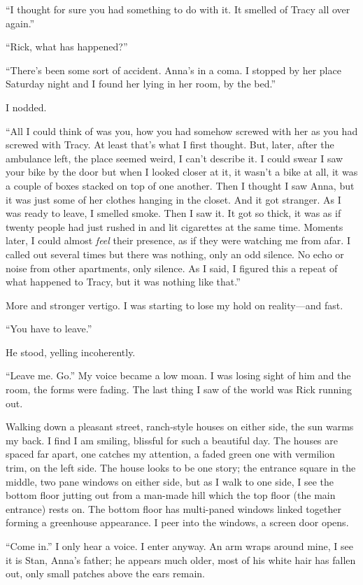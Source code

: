 ``I thought for sure you had something to do with it. It smelled of
Tracy all over again.''

``Rick, what has happened?''

``There's been some sort of accident. Anna's in a coma. I stopped by her
place Saturday night and I found her lying in her room, by the bed.''

I nodded.

``All I could think of was you, how you had somehow screwed with her as
you had screwed with Tracy. At least that's what I first thought. But,
later, after the ambulance left, the place seemed weird, I can't
describe it. I could swear I saw your bike by the door but when I looked
closer at it, it wasn't a bike at all, it was a couple of boxes stacked
on top of one another. Then I thought I saw Anna, but it was just some
of her clothes hanging in the closet. And it got stranger. As I was
ready to leave, I smelled smoke. Then I saw it. It got so thick, it was
as if twenty people had just rushed in and lit cigarettes at the same
time. Moments later, I could almost \emph{feel} their presence, as if
they were watching me from afar. I called out several times but there
was nothing, only an odd silence. No echo or noise from other
apartments, only silence. As I said, I figured this a repeat of what
happened to Tracy, but it was nothing like that.''

More and stronger vertigo. I was starting to lose my hold on
reality---and fast.

``You have to leave.''

He stood, yelling incoherently.

``Leave me. Go.'' My voice became a low moan. I was losing sight of him
and the room, the forms were fading. The last thing I saw of the world
was Rick running out.

Walking down a pleasant street, ranch-style houses on either side, the
sun warms my back. I find I am smiling, blissful for such a beautiful
day. The houses are spaced far apart, one catches my attention, a faded
green one with vermilion trim, on the left side. The house looks to be
one story; the entrance square in the middle, two pane windows on either
side, but as I walk to one side, I see the bottom floor jutting out from
a man-made hill which the top floor (the main entrance) rests on. The
bottom floor has multi-paned windows linked together forming a
greenhouse appearance. I peer into the windows, a screen door opens.

``Come in.'' I only hear a voice. I enter anyway. An arm wraps around
mine, I see it is Stan, Anna's father; he appears much older, most of
his white hair has fallen out, only small patches above the ears remain.

